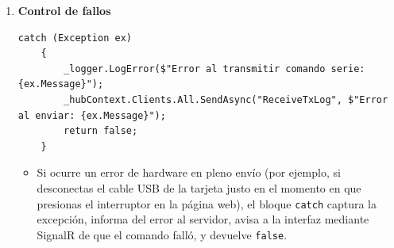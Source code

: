 \documentclass[
10pt, %
a4paper, %
oneside, %
headinclude,footinclude, %
BCOR5mm, %
]{scrartcl}
\begin{document}
\begin{enumerate}
\begin{lstlisting}[style=VSCodeDark]
	// Registra la transmision en el panel web
	_hubContext.Clients.All.SendAsync("ReceiveTxLog", $"Enviado: '{cmd}'");
	return true;
}
	\end{lstlisting}
	\begin{itemize}
		\item \texttt{\_serialPort.Write(cmd)}: Esta línea de código toma la cadena cmd y la transmite eléctricamente a través del canal TX del cable de comunicación
		\item SignalR \texttt{ReceiveTxLog}: Envía un mensaje instantáneo a la interfaz gráfica del usuario con el texto \texttt{"Enviado: '1'"} o \texttt{"Enviado: '0'"}, permitiendo que el log del cliente web muestre la acción inmediatamente en su pantalla.
	\end{itemize}
	\item \textbf{Control de fallos}
	\begin{lstlisting}[style=VSCodeDark]
	catch (Exception ex)
	{
		_logger.LogError($"Error al transmitir comando serie: {ex.Message}");
		_hubContext.Clients.All.SendAsync("ReceiveTxLog", $"Error al enviar: {ex.Message}");
		return false;
	}
	\end{lstlisting}
	\begin{itemize}
		\item Si ocurre un error de hardware en pleno envío (por ejemplo, si desconectas el cable USB de la tarjeta justo en el momento en que presionas el interruptor en la página web), el bloque \texttt{catch} captura la excepción, informa del error al servidor, avisa a la interfaz mediante SignalR de que el comando falló, y devuelve \texttt{false}.
	\end{itemize}
\end{enumerate}
\end{document}
